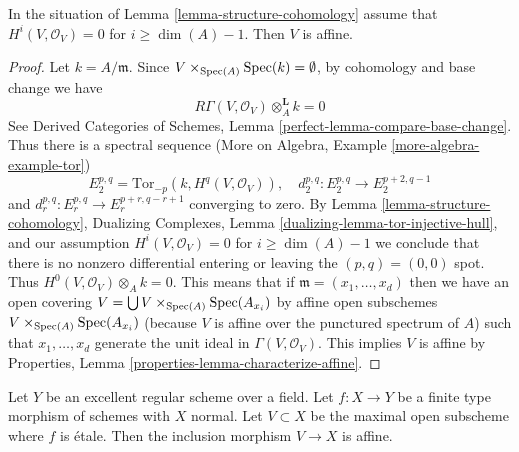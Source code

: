 \begin{lemma}
\label{lemma-conclude}
In the situation of Lemma \ref{lemma-structure-cohomology}
assume that $H^i(V, \mathcal{O}_V) = 0$ for $i \geq \dim(A) - 1$.
Then $V$ is affine.
\end{lemma}

\begin{proof}
Let $k = A/\mathfrak m$. Since $V \times_{\mathop{\mathrm{Spec}}(A)} \mathop{\mathrm{Spec}}(k) = \emptyset$,
by cohomology and base change we have
$$
R\Gamma(V, \mathcal{O}_V) \otimes_A^\mathbf{L} k = 0
$$
See
Derived Categories of Schemes, Lemma \ref{perfect-lemma-compare-base-change}.
Thus there is a spectral sequence
(More on Algebra, Example \ref{more-algebra-example-tor})
$$
E_2^{p, q} = \text{Tor}_{-p}(k, H^q(V, \mathcal{O}_V)),\quad
d_2^{p, q} : E_2^{p, q} \to E_2^{p + 2, q - 1}
$$
and $d_r^{p, q} : E_r^{p, q} \to E_r^{p + r, q - r + 1}$
converging to zero. By Lemma \ref{lemma-structure-cohomology},
Dualizing Complexes, Lemma \ref{dualizing-lemma-tor-injective-hull},
and our assumption $H^i(V, \mathcal{O}_V) = 0$ for $i \geq \dim(A) - 1$
we conclude that there is no nonzero differential
entering or leaving the $(p, q) = (0, 0)$ spot. Thus
$H^0(V, \mathcal{O}_V) \otimes_A k = 0$. This means that
if $\mathfrak m = (x_1, \ldots, x_d)$ then we have
an open covering $V = \bigcup V \times_{\mathop{\mathrm{Spec}}(A)} \mathop{\mathrm{Spec}}(A_{x_i})$
by affine open subschemes $V \times_{\mathop{\mathrm{Spec}}(A)} \mathop{\mathrm{Spec}}(A_{x_i})$
(because $V$ is affine over the punctured spectrum of $A$)
such that $x_1, \ldots, x_d$ generate
the unit ideal in $\Gamma(V, \mathcal{O}_V)$.
This implies $V$ is affine by
Properties, Lemma \ref{properties-lemma-characterize-affine}.
\end{proof}

\begin{theorem}
\label{theorem-global}
Let $Y$ be an excellent regular scheme over a field. Let $f : X \to Y$
be a finite type morphism of schemes with $X$ normal. Let $V \subset X$
be the maximal open subscheme where $f$ is \'etale. Then the inclusion
morphism $V \to X$ is affine.
\end{theorem}

